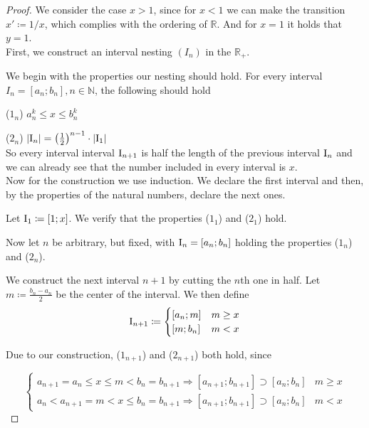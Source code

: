 \documentclass[a4paper, 10pt]{article}
\theoremstyle{definition}
\theoremstyle{definition}
\begin{document}
    \begin{proof} We consider the case \(x > 1\), since for \(x < 1\) we can make the transition \(x' \coloneqq 1/x\), which complies with the ordering of \(\mathbb{R}\). And for \(x = 1\) it holds that \(y = 1\).\\

    First, we construct an interval nesting \((I_n)\) in the \(\mathbb{R}_+\).
    
    We begin with the properties our nesting should hold. For every interval \(I_n = [a_n; b_n], n \in \mathbb{N}\), the following should hold\\

    \item{\hspace{0.5cm}(\(1_n\))} \(a_n^k \leq x \leq b_n^k\)
    
    \item{\hspace{0.5cm}(\(2_n\))} \(|\text{I}_n| = \left(\frac{1}{2}\right)^{n-1}\cdot|\text{I}_1|\)\\

    So every interval interval \(\text{I}_{n + 1}\) is half the length of the previous interval \(\text{I}_n\) and we can already see that the number included in every interval is \(x\).\\

    Now for the construction we use induction. We declare the first interval and then, by the properties of the natural numbers, declare the next ones.

    Let \(\text{I}_1 \coloneqq [1; x]\). We verify that the properties (\(1_1\)) and (\(2_1\)) hold.
    
    Now let \(n\) be arbitrary, but fixed, with \(\text{I}_n = [a_n; b_n]\) holding the properties (\(1_n\)) and (\(2_n\)).
    
    We construct the next interval \(n + 1\) by cutting the \(n\)th one in half. Let \(m \coloneqq \frac{b_n - a_n}{2}\) be the center of the interval. We then define
    \[
        \text{I}_{n+1} \coloneqq \begin{cases}
            [a_n; m] & m \geq x\\
            [m; b_n] & m < x
        \end{cases}
    \]

    Due to our construction, (\(1_{n+1}\)) and (\(2_{n+1}\)) both hold, since
    
    \[
        \begin{cases}
            a_{n+1} = a_n \leq x \leq m < b_n = b_{n+1} \Rightarrow [a_{n+1};b_{n+1}] \supset [a_n;b_n] & m \geq x\\
            a_n < a_{n+1} = m < x \leq b_n = b_{n+1} \Rightarrow [a_{n+1};b_{n+1}] \supset [a_n;b_n] & m < x
        \end{cases}
    \]


\end{proof}
\end{document}
